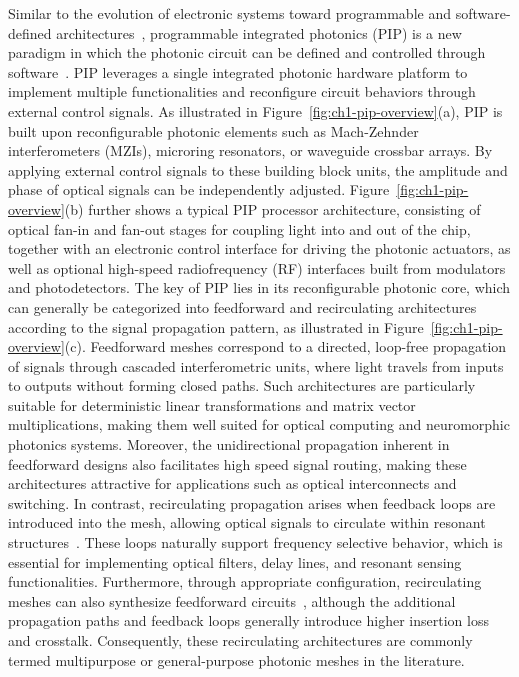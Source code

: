 Similar to the evolution of electronic systems toward programmable and software-defined architectures~\cite{oldfield1995field}, programmable integrated photonics (PIP) is a new paradigm in which the photonic circuit can be defined and controlled through software~\cite{capmany2020programmable, bogaerts2020programmable}.
PIP leverages a single integrated photonic hardware platform to implement multiple functionalities and reconfigure circuit behaviors through external control signals.
As illustrated in Figure~\ref{fig:ch1-pip-overview}(a), PIP is built upon reconfigurable photonic elements such as Mach-Zehnder interferometers (MZIs), microring resonators, or waveguide crossbar arrays.
By applying external control signals to these building block units, the amplitude and phase of optical signals can be independently adjusted.
Figure~\ref{fig:ch1-pip-overview}(b) further shows a typical PIP processor architecture, consisting of optical fan-in and fan-out stages for coupling light into and out of the chip, together with an electronic control interface for driving the photonic actuators,
as well as optional high-speed radiofrequency (RF) interfaces built from modulators and photodetectors.
The key of PIP lies in its reconfigurable photonic core, which can generally be categorized into feedforward and recirculating architectures according to the signal propagation pattern, as illustrated in Figure~\ref{fig:ch1-pip-overview}(c).
Feedforward meshes correspond to a directed, loop-free propagation of signals through cascaded interferometric units, where light travels from inputs to outputs without forming closed paths.
Such architectures are particularly suitable for deterministic linear transformations and matrix vector multiplications, making them well suited for optical computing and neuromorphic photonics systems.
Moreover, the unidirectional propagation inherent in feedforward designs also facilitates high speed signal routing, making these architectures attractive for applications such as optical interconnects and switching.
In contrast, recirculating propagation arises when feedback loops are introduced into the mesh, allowing optical signals to circulate within resonant structures~\cite{reconfig}.
These loops naturally support frequency selective behavior, which is essential for implementing optical filters, delay lines, and resonant sensing functionalities.
Furthermore, through appropriate configuration, recirculating meshes can also synthesize feedforward circuits~\cite{perez2017multipurpose}, although the additional propagation paths and feedback loops generally introduce higher insertion loss and crosstalk.
Consequently, these recirculating architectures are commonly termed multipurpose or general-purpose photonic meshes in the literature.

